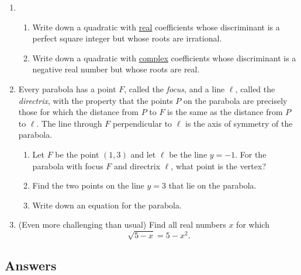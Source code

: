 \begin{enumerate}[resume]
\item \begin{enumerate}
\item Write down a quadratic with \underline{real} coefficients whose discriminant is a perfect square integer but whose roots are irrational.
\item Write down a quadratic with \underline{complex} coefficients whose discriminant is a negative real number but whose roots are real.
\end{enumerate}
\item Every parabola has a point $F$, called the \emph{focus}, and a line $\ell$, called the \emph{directrix}, with the property that the points $P$ on the parabola are precisely those for which the distance from $P$ to $F$ is the same as the distance from $P$ to $\ell$. The line through $F$ perpendicular to $\ell$ is the axis of symmetry of the parabola.
\begin{enumerate}
\item Let $F$ be the point $(1,3)$ and let $\ell$ be the line $y = -1$. For the parabola with focus $F$ and directrix $\ell$, what point is the vertex?
\item Find the two points on the line $y = 3$ that lie on the parabola.
\item Write down an equation for the parabola.
\end{enumerate}
\item (Even more challenging than usual) Find all real numbers $x$ for which
\begin{equation*}
\sqrt{5 - x} = 5 - x^2.
\end{equation*}
\end{enumerate}


\newpage
\subsection{Answers}

